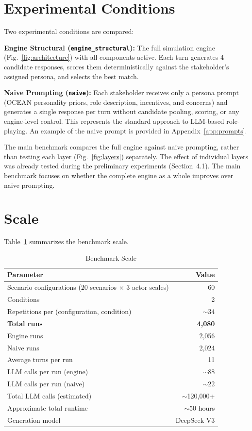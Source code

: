 \documentclass[12pt, a4paper]{report}
\newcommand{\engine}{\texttt{engine\_structural}}
\newcommand{\naive}{\texttt{naive}}
\begin{document}
\section{Experimental Conditions}

Two experimental conditions are compared:

\textbf{Engine Structural (\engine):} The full simulation engine (Fig.~\ref{fig:architecture}) with all components active. Each turn generates 4 candidate responses, scores them deterministically against the stakeholder's assigned persona, and selects the best match.

\textbf{Naive Prompting (\naive):} Each stakeholder receives only a persona prompt (OCEAN personality priors, role description, incentives, and concerns) and generates a single response per turn without candidate pooling, scoring, or any engine-level control. This represents the standard approach to LLM-based role-playing. An example of the naive prompt is provided in Appendix~\ref{app:prompts}.

The main benchmark compares the full engine against naive prompting, rather than testing each layer (Fig.~\ref{fig:layers}) separately. The effect of individual layers was already tested during the preliminary experiments (Section~4.1). The main benchmark focuses on whether the complete engine as a whole improves over naive prompting.



\section{Scale}

Table~\ref{tab:scale} summarizes the benchmark scale.

\begin{table}[t]
\centering
\caption{Benchmark Scale}
\label{tab:scale}
\begin{tabular}{lr}
\toprule
Parameter & Value \\
\midrule
Scenario configurations (20 scenarios $\times$ 3 actor scales) & 60 \\
Conditions                        & 2 \\
Repetitions per (configuration, condition) & $\sim$34 \\
\textbf{Total runs}               & \textbf{4,080} \\
  \quad Engine runs               & 2,056 \\
  \quad Naive runs                & 2,024 \\
Average turns per run             & 11 \\
LLM calls per run (engine)       & $\sim$88 \\
LLM calls per run (naive)        & $\sim$22 \\
Total LLM calls (estimated)      & $\sim$120,000+ \\
Approximate total runtime         & $\sim$50 hours \\
Generation model                  & DeepSeek V3 \\
\bottomrule
\end{tabular}
\end{table}
\end{document}

